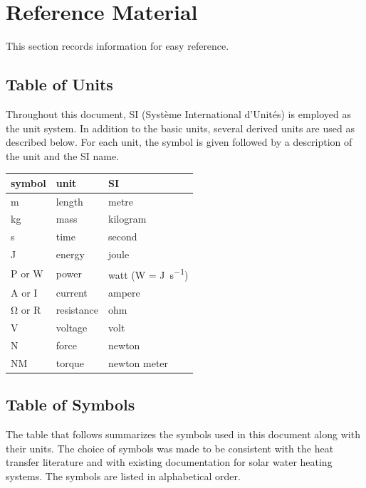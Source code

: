 \documentclass[12pt]{article}
\begin{document}
\newpage
{}
\section{Reference Material}

This section records information for easy reference.

\subsection{Table of Units}

Throughout this document, SI (Syst\`{e}me International d'Unit\'{e}s) is employed
as the unit system.  In addition to the basic units, several derived units are
used as described below.  For each unit, the symbol is given followed by a
description of the unit and the SI name.
~\newline

\renewcommand{\arraystretch}{1.2}
  \noindent \begin{tabular}{l l l} 
    \toprule		
    \textbf{symbol} & \textbf{unit} & \textbf{SI}\\
    \midrule 
    \si{\metre} & length & metre\\
    \si{\kilogram} & mass	& kilogram\\
    \si{\second} & time & second\\
    \si{\joule} & energy & joule\\
    P or \si{\watt} & power & watt (W = \si{\joule\per\second})\\
    \si{\ampere} or I& current & ampere\\
    \si{\ohm} or R& resistance & ohm\\
    \si{\volt} & voltage & volt\\
    \si{\newton} & force & newton\\
    \si{\newton}M & torque & newton meter\\
    \bottomrule
  \end{tabular}

\subsection{Table of Symbols}

The table that follows summarizes the symbols used in this document along with
their units.  The choice of symbols was made to be consistent with the heat
transfer literature and with existing documentation for solar water heating
systems.  The symbols are listed in alphabetical order.
\end{document}
